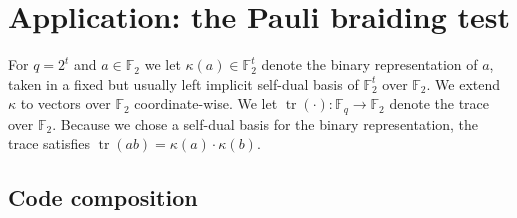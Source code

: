 \documentclass[11pt]{article}
\theoremstyle{definition}
\newtheorem{definition}[theorem]{Definition}
\newcommand{\code}{\mathcal{C}}
\newcommand{\field}{\mathbb{F}_2}
\newcommand{\N}{\ensuremath{\mathbb{N}}}
\newcommand{\F}{\ensuremath{\mathbb{F}}}
\newcommand{\eps}{\varepsilon}
\DeclareMathOperator{\tr}{tr}
\begin{document}
\section{Application: the Pauli braiding test}
\label{sec:pbt}


For $q=2^t$ and $a\in \field$ we let $\kappa(a)\in\F_2^t$ denote the binary representation of $a$, taken in a fixed but usually left implicit self-dual basis of $\F_2^t$ over $\F_2$. We extend $\kappa$ to vectors over $\field$ coordinate-wise. We let $\tr(\cdot):\F_q\to\F_2$ denote the trace over $\F_2$. Because we chose a self-dual basis for the binary representation, the trace satisfies $\tr(ab)=\kappa(a)\cdot\kappa(b)$. 
	


%
%
%

\subsection{Code composition}
\label{sec:code-comp}
\end{document}
